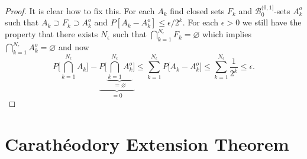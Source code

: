 \begin{proof}
It is clear how to fix this. For each $A_k$ find  closed sets $F_k$ and $\mathcal B_0^{(0,1]}$-sets $A_k^o$ such that $A_k\supset F_k \supset A_k^o$ and $P[A_k-A_k^o]\leq \epsilon / 2^k$. For each $\epsilon>0$ we still have the property that there exists $N_\epsilon$ such that  $\bigcap_{k=1}^{N_\epsilon}F_k = \varnothing$ which  implies $\bigcap_{k=1}^{N_\epsilon}A^o_k = \varnothing$  and now
\[
P\bigl[ \textstyle\bigcap_{k=1}^{N_\epsilon} A_k\bigr] - \underbrace{P\bigl[ \underbrace{\textstyle\bigcap_{k=1}^{N_\epsilon} A^o_k}_{=\varnothing}\bigr]}_{=0}\leq  \sum_{k=1}^{N_\epsilon} P\bigl[A_k-A^o_k \bigr] \leq \sum_{k=1}^{N_\epsilon} \frac{1}{2^k}\leq \epsilon.
\]
\end{proof}



\clearpage
\section{Carath\'eodory Extension Theorem}

